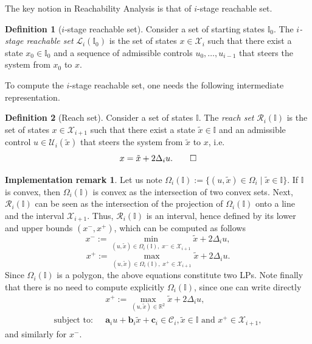 \documentclass[journal]{IEEEtran}
\theoremstyle{plain}
\theoremstyle{definition}
\newtheorem{definition2}{Definition}
\newenvironment{definition}
  {\renewcommand{\qedsymbol}{$\lozenge$}
   \pushQED{\qed}\begin{definition2}}
  {\popQED\end{definition2}}
\theoremstyle{definition}
\newtheorem{remark2}{Implementation remark}
\newenvironment{remark}
  {\renewcommand{\qedsymbol}{$\lozenge$}%
   \pushQED{\qed}\begin{remark2}}
  {\popQED\end{remark2}}
\newcommand{\cC}{\mathscr{C}}
\newcommand{\calX}{\mathcal{X}}
\newcommand{\calU}{\mathcal{U}}
\newcommand{\bbI}{\mathbb{I}}
\newcommand{\calR}{\mathcal{R}}
\begin{document}

The key notion in Reachability Analysis is that of $i$-stage reachable
set.

\begin{definition}[$i$-stage reachable set]
  Consider a set of starting states $\bbI_0$. The \emph{$i$-stage
    reachable set} $\mathcal{L}_i(\bbI_0)$ is the set of states
  $x\in\calX_i$ such that there exist a state $x_0\in \bbI_0$ and a
  sequence of admissible controls $u_0,\dots, u_{i-1}$ that steers the
  system from $x_0$ to $x$.
\end{definition}

To compute the $i$-stage reachable set, one needs the following
intermediate representation.
\begin{definition}[Reach set]
  Consider a set of states $\bbI$. The \emph{reach set}
  $\calR_i(\bbI)$ is the set of states $x \in \calX_{i+1}$ such that
  there exist a state $\tilde{x}\in\bbI$ and an admissible control
  $u\in\calU_i(\tilde{x})$ that steers the system from $\tilde{x}$ to
  $x$, i.e.
  \[
  x = \tilde{x} + 2\Delta_i u. \qedhere
  \]
\end{definition}

\begin{remark}
  \label{rem:convex}
  Let us note
  $\Omega_i(\bbI) := \{(u,\tilde{x})\in\Omega_i \mid
  \tilde{x}\in\bbI\}$.
  If $\bbI$ is convex, then $\Omega_i(\bbI)$ is convex as the
  intersection of two convex sets.  Next, $\calR_i(\bbI)$ can be seen
  as the intersection of the projection of $\Omega_i(\bbI)$ onto a line
  and the interval $\calX_{i+1}$. Thus,
  $\calR_i(\bbI)$ is an interval, hence defined by its lower and upper
  bounds $(x^-,x^+)$, which can be computed as follows
  \[
  x^- := \min_{(u,\tilde{x})\in\Omega_i(\bbI),\; x^- \in \calX_{i+1}} \tilde{x} + 2\Delta_i u,
  \]
  \[
  x^+ := \max_{(u,\tilde{x})\in\Omega_i(\bbI),\; x^+ \in \calX_{i+1}} \tilde{x} + 2\Delta_i u.
  \]
  Since $\Omega_i(\bbI)$ is a polygon, the above equations constitute
  two LPs. Note finally that there is no need to compute
  explicitly $\Omega_i(\bbI)$, since one can write directly
  \[
    \begin{aligned}
      &x^+ := \max_{(u,\tilde{x})\in\mathbb{R}^2} \tilde{x} + 2\Delta_i u, \\
      \textrm{subject to:~~} &\mathbf{a}_i u + \mathbf{b}_i \tilde{x}+ \mathbf{c}_i
      \in \cC_i, \tilde{x}\in\bbI  \textrm{~and~} x^{+} \in \calX_{i+1},
    \end{aligned}
  \]
  and similarly for $x^-$.
\end{remark}
\end{document}

